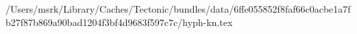 /Users/msrk/Library/Caches/Tectonic/bundles/data/6ffe055852f8faf66c0acbe1a7fb27f87b869a90bad1204f3bf4d9683f597c7c/hyph-kn.tex